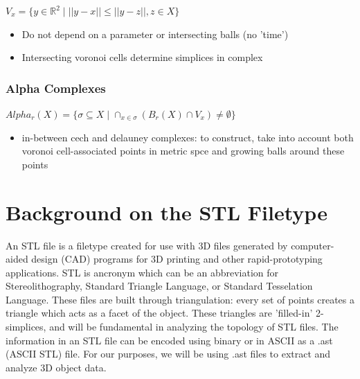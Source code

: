 \documentclass[ma]{uncgdissertationexp}
\theoremstyle{plain}
\theoremstyle{definition}
\theoremstyle{remark}
\begin{document}
$V_{x} = \{y \in \mathbb{R}^{2} \mid ||y-x|| \leq  ||y-z||, z \in X\}$
\begin{itemize}
\item Do not depend on a parameter or intersecting balls (no 'time')
\item Intersecting voronoi cells determine simplices in complex
\end{itemize}

\subsubsection{Alpha Complexes}
$Alpha_{r}(X)=\{\sigma \subseteq X \mid \cap_{x\in \sigma} (B_{r}(X) \cap V_{x}) \not= \emptyset\}$
\begin{itemize}
\item in-between cech and delauney complexes: to construct, take into account both voronoi cell-associated points in metric spce and growing balls around these points
\end{itemize}

\newpage
\section{Background on the STL Filetype}
An STL file is a filetype created for use with 3D files generated by computer-aided design (CAD) programs for 3D printing and other rapid-prototyping applications. STL is ancronym which can be an abbreviation for Stereolithography, Standard Triangle Language, or Standard Tesselation Language. These files are built through triangulation: every set of points creates a triangle which acts as a facet of the object. These triangles are 'filled-in' 2-simplices, and will be fundamental in analyzing the topology of STL files. The information in an STL file can be encoded using binary or in ASCII as a .ast (ASCII STL) file. For our purposes, we will be using .ast files to extract and analyze 3D object data. \cite{STL_info}
\end{document}
